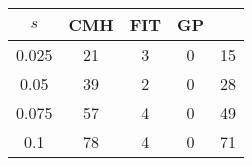 \centering \begin{tabular}{c|c|c|c|c}
$s$	&CMH	&FIT	&GP	&\sc{Clear}\\\hline
0.025	&21	&3	&0	&15\\
0.05	&39	&2	&0	&28\\
0.075	&57	&4	&0	&49\\
0.1	&78	&4	&0	&71\\
\end{tabular}

